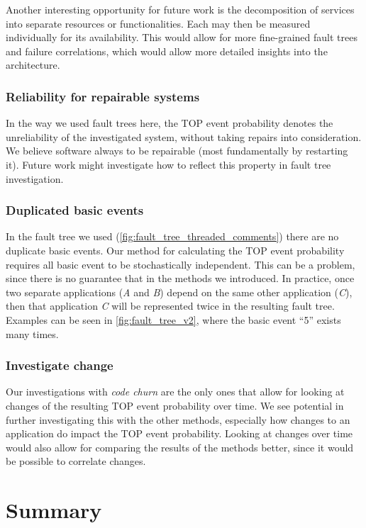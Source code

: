 Another interesting opportunity for future work is the decomposition of services into separate resources or functionalities. Each may then be measured individually for its availability. This would allow for more fine-grained fault trees and failure correlations, which would allow more detailed insights into the architecture.

\subsubsection{Reliability for repairable systems}

In the way we used fault trees here, the TOP event probability denotes the unreliability of the investigated system, without taking repairs into consideration. We believe software always to be repairable (most fundamentally by restarting it). Future work might investigate how to reflect this property in fault tree investigation.

\subsubsection{Duplicated basic events}

In the fault tree we used (\autoref{fig:fault_tree_threaded_comments}) there are no duplicate basic events. Our method for calculating the TOP event probability requires all basic event to be stochastically independent. This can be a problem, since there is no guarantee that in the methods we introduced. In practice, once two separate applications (\emph{A} and \emph{B}) depend on the same other application (\emph{C}), then that application \emph{C} will be represented twice in the resulting fault tree. Examples can be seen in \autoref{fig:fault_tree_v2}, where the basic event ``5'' exists many times.

\subsubsection{Investigate change}

Our investigations with \emph{code churn} are the only ones that allow for looking at changes of the resulting TOP event probability over time. We see potential in further investigating this with the other methods, especially how changes to an application do impact the TOP event probability. Looking at changes over time would also allow for comparing the results of the methods better, since it would be possible to correlate changes.

\section{Summary}

